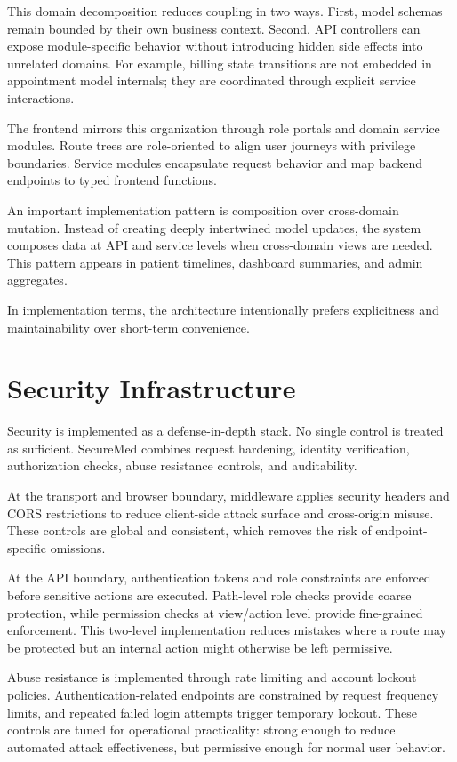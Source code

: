 This domain decomposition reduces coupling in two ways. First, model schemas remain bounded by their own business context. Second, API controllers can expose module-specific behavior without introducing hidden side effects into unrelated domains. For example, billing state transitions are not embedded in appointment model internals; they are coordinated through explicit service interactions.

The frontend mirrors this organization through role portals and domain service modules. Route trees are role-oriented to align user journeys with privilege boundaries. Service modules encapsulate request behavior and map backend endpoints to typed frontend functions.

An important implementation pattern is composition over cross-domain mutation. Instead of creating deeply intertwined model updates, the system composes data at API and service levels when cross-domain views are needed. This pattern appears in patient timelines, dashboard summaries, and admin aggregates.

In implementation terms, the architecture intentionally prefers explicitness and maintainability over short-term convenience.

\section{Security Infrastructure}\label{53-security-infrastructure}

Security is implemented as a defense-in-depth stack. No single control is treated as sufficient. SecureMed combines request hardening, identity verification, authorization checks, abuse resistance controls, and auditability.

At the transport and browser boundary, middleware applies security headers and CORS restrictions to reduce client-side attack surface and cross-origin misuse. These controls are global and consistent, which removes the risk of endpoint-specific omissions.

At the API boundary, authentication tokens and role constraints are enforced before sensitive actions are executed. Path-level role checks provide coarse protection, while permission checks at view/action level provide fine-grained enforcement. This two-level implementation reduces mistakes where a route may be protected but an internal action might otherwise be left permissive.

Abuse resistance is implemented through rate limiting and account lockout policies. Authentication-related endpoints are constrained by request frequency limits, and repeated failed login attempts trigger temporary lockout. These controls are tuned for operational practicality: strong enough to reduce automated attack effectiveness, but permissive enough for normal user behavior.

